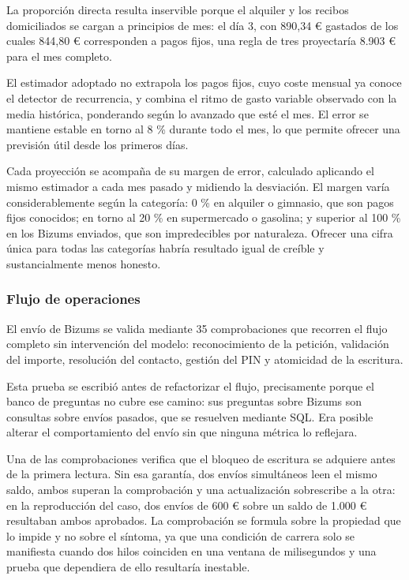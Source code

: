 La proporción directa resulta inservible porque el alquiler y los recibos
domiciliados se cargan a principios de mes: el día 3, con 890,34 € gastados de
los cuales 844,80 € corresponden a pagos fijos, una regla de tres proyectaría
8.903 € para el mes completo.

El estimador adoptado no extrapola los pagos fijos, cuyo coste mensual ya conoce
el detector de recurrencia, y combina el ritmo de gasto variable observado con
la media histórica, ponderando según lo avanzado que esté el mes. El error se
mantiene estable en torno al 8 \% durante todo el mes, lo que permite ofrecer
una previsión útil desde los primeros días.

Cada proyección se acompaña de su margen de error, calculado aplicando el mismo
estimador a cada mes pasado y midiendo la desviación. El margen varía
considerablemente según la categoría: 0 \% en alquiler o gimnasio, que son pagos
fijos conocidos; en torno al 20 \% en supermercado o gasolina; y superior al
100 \% en los Bizums enviados, que son impredecibles por naturaleza. Ofrecer una
cifra única para todas las categorías habría resultado igual de creíble y
sustancialmente menos honesto.

\subsubsection{Flujo de operaciones}

El envío de Bizums se valida mediante 35 comprobaciones que recorren el flujo
completo sin intervención del modelo: reconocimiento de la petición, validación
del importe, resolución del contacto, gestión del PIN y atomicidad de la
escritura.

Esta prueba se escribió antes de refactorizar el flujo, precisamente porque el
banco de preguntas no cubre ese camino: sus preguntas sobre Bizums son consultas
sobre envíos pasados, que se resuelven mediante SQL. Era posible alterar el
comportamiento del envío sin que ninguna métrica lo reflejara.

Una de las comprobaciones verifica que el bloqueo de escritura se adquiere antes
de la primera lectura. Sin esa garantía, dos envíos simultáneos leen el mismo
saldo, ambos superan la comprobación y una actualización sobrescribe a la otra:
en la reproducción del caso, dos envíos de 600 € sobre un saldo de 1.000 €
resultaban ambos aprobados. La comprobación se formula sobre la propiedad que lo
impide y no sobre el síntoma, ya que una condición de carrera solo se manifiesta
cuando dos hilos coinciden en una ventana de milisegundos y una prueba que
dependiera de ello resultaría inestable.

